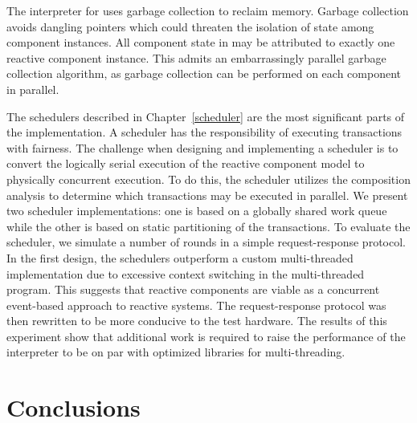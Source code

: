 The interpreter for \rcgo{} uses garbage collection to reclaim memory.
Garbage collection avoids dangling pointers which could threaten the isolation of state among component instances.
All component state in \rcgo{} may be attributed to exactly one reactive component instance.
This admits an embarrassingly parallel garbage collection algorithm, as garbage collection can be performed on each component in parallel.

The schedulers described in Chapter~\ref{scheduler} are the most significant parts of the \rcgo{} implementation.
A scheduler has the responsibility of executing transactions with fairness.
The challenge when designing and implementing a scheduler is to convert the logically serial execution of the reactive component model to physically concurrent execution.
To do this, the scheduler utilizes the composition analysis to determine which transactions may be executed in parallel.
We present two scheduler implementations:  one is based on a globally shared work queue while the other is based on static partitioning of the transactions.
To evaluate the scheduler, we simulate a number of rounds in a simple request-response protocol.
In the first design, the \rcgo{} schedulers outperform a custom multi-threaded implementation due to excessive context switching in the multi-threaded program.
This suggests that reactive components are viable as a concurrent event-based approach to reactive systems.
The request-response protocol was then rewritten to be more conducive to the test hardware.
The results of this experiment show that additional work is required to raise the performance of the \rcgo{} interpreter to be on par with optimized libraries for multi-threading.

\section{Conclusions}

